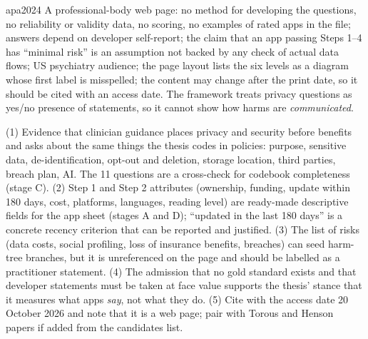 \begin{papercard}{apa2024}
 A professional-body web page: no method for developing the questions, no reliability or validity data, no scoring, no examples of rated apps in the file; answers depend on developer self-report; the claim that an app passing Steps 1--4 has ``minimal risk'' is an assumption not backed by any check of actual data flows; US psychiatry audience; the page layout lists the six levels as a diagram whose first label is misspelled; the content may change after the print date, so it should be cited with an access date. The framework treats privacy questions as yes/no presence of statements, so it cannot show how harms are \emph{communicated}.

 (1) Evidence that clinician guidance places privacy and security before benefits and asks about the same things the thesis codes in policies: purpose, sensitive data, de-identification, opt-out and deletion, storage location, third parties, breach plan, AI. The 11 questions are a cross-check for codebook completeness (stage C). (2) Step 1 and Step 2 attributes (ownership, funding, update within 180 days, cost, platforms, languages, reading level) are ready-made descriptive fields for the app sheet (stages A and D); ``updated in the last 180 days'' is a concrete recency criterion that can be reported and justified. (3) The list of risks (data costs, social profiling, loss of insurance benefits, breaches) can seed harm-tree branches, but it is unreferenced on the page and should be labelled as a practitioner statement. (4) The admission that no gold standard exists and that developer statements must be taken at face value supports the thesis' stance that it measures what apps \emph{say}, not what they do. (5) Cite with the access date 20 October 2026 and note that it is a web page; pair with Torous and Henson papers if added from the candidates list.
\end{papercard}
